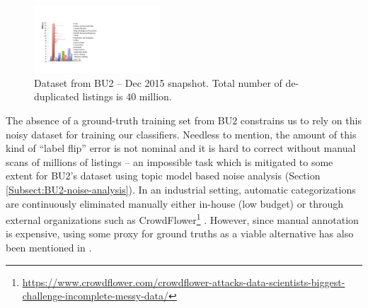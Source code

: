 \begin{figure}
	\centering
	\vspace{-0.5cm}
	\includegraphics[width=0.42\textwidth]{images/BU2-dataset-Dec2015}
	\vspace{-0.6cm}
	\caption{{\small Dataset from BU2 -- Dec 2015 snapshot. Total number of de-duplicated listings is 40 million.}}
	\vspace{-0.5cm}
	\label{Figure_BU2-datset-earlier}
\end{figure}
The absence of a ground-truth training set from BU2 constrains us to rely on this noisy dataset for training our classifiers. 
Needless to mention, the amount of this kind of ``label flip'' error is not nominal and it is hard to correct without manual scans of millions of listings -- an impossible task which is mitigated to some extent for BU2's dataset using topic model based noise analysis (Section \ref{Subsect:BU2-noise-analysis}).
In an industrial setting, automatic categorizations are continuously eliminated manually either in-house (low budget) or through external organizations such as CrowdFlower\footnote{\scriptsize{\url{https://www.crowdflower.com/crowdflower-attacks-data-scientists-biggest-challenge-incomplete-messy-data/}}} \cite{Sun14}.
However, since manual annotation is expensive, using some proxy for ground truths as a viable alternative has also been mentioned in \cite{Shen12}.


